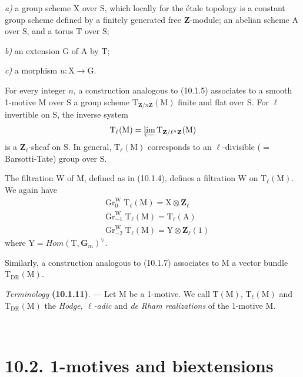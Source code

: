 \documentclass[11pt,leqno]{article}
\newcommand{\Page}[1]{\ifvmode\noindent\else\unskip\ \fi{\footnotesize\textcolor{gray}{[p.\,#1]}}\ \ignorespaces}
\begin{document}
\noindent \textit{a)} a group scheme \(\mathrm{X}\) over
\(\mathrm{S}\), which locally for the étale topology is a constant
group scheme defined by a finitely generated free \(\mathbf{Z}\)-module;
an abelian scheme \(\mathrm{A}\) over \(\mathrm{S}\), and a torus
\(\mathrm{T}\) over \(\mathrm{S}\);\par
\noindent \textit{b)} an extension \(\mathrm{G}\) of \(\mathrm{A}\)
by \(\mathrm{T}\);\par
\noindent \textit{c)} a morphism \(u:\mathrm{X}\to\mathrm{G}\).

For every integer \(n\), a construction analogous to (10.1.5) associates
to a smooth 1-motive \(\mathrm{M}\) over \(\mathrm{S}\) a group
scheme \(\mathrm{T}_{\mathbf{Z}/n\mathbf{Z}}(\mathrm{M})\) finite and
flat over \(\mathrm{S}\). For \(\ell\) invertible on \(\mathrm{S}\),
the inverse system
\[
\mathrm{T}_{\ell}(\mathrm{M})
=\varprojlim\mathrm{T}_{\mathbf{Z}/\ell^n\mathbf{Z}}(\mathrm{M})
\]
is a \(\mathbf{Z}_{\ell}\)-sheaf on \(\mathrm{S}\). In general,
\(\mathrm{T}_{\ell}(\mathrm{M})\) corresponds to an
\(\ell\)-divisible (\(=\) Barsotti-Tate) group over \(\mathrm{S}\).

The filtration \(\mathrm{W}\) of \(\mathrm{M}\), defined as in
(10.1.4), defines a filtration \(\mathrm{W}\) on
\(\mathrm{T}_{\ell}(\mathrm{M})\). We again have
\[
\begin{aligned}
&\operatorname{Gr}^{\mathrm{W}}_0\mathrm{T}_{\ell}(\mathrm{M})
  =\mathrm{X}\otimes\mathbf{Z}_{\ell}
\\
&\operatorname{Gr}^{\mathrm{W}}_{-1}\mathrm{T}_{\ell}(\mathrm{M})
  =\mathrm{T}_{\ell}(\mathrm{A})
\\
&\operatorname{Gr}^{\mathrm{W}}_{-2}\mathrm{T}_{\ell}(\mathrm{M})
  =\mathrm{Y}\otimes\mathbf{Z}_{\ell}(1)
\end{aligned}
\]
where \(\mathrm{Y}=\mathit{Hom}(\mathrm{T},\mathbf{G}_m)^{\vee}\).

Similarly, a construction analogous to (10.1.7) associates to \(\mathrm{M}\)
a vector bundle \(\mathrm{T}_{\mathrm{DR}}(\mathrm{M})\).

\textit{Terminology} \textbf{(10.1.11)}. —
Let \(\mathrm{M}\) be a 1-motive. We call \(\mathrm{T}(\mathrm{M})\),
\(\mathrm{T}_{\ell}(\mathrm{M})\) and
\(\mathrm{T}_{\mathrm{DR}}(\mathrm{M})\) the
\textit{Hodge, \(\ell\)-adic} and
\textit{de Rham realizations} of the 1-motive \(\mathrm{M}\).

\Page{60}
\section*{10.2. 1-motives and biextensions}
\end{document}
